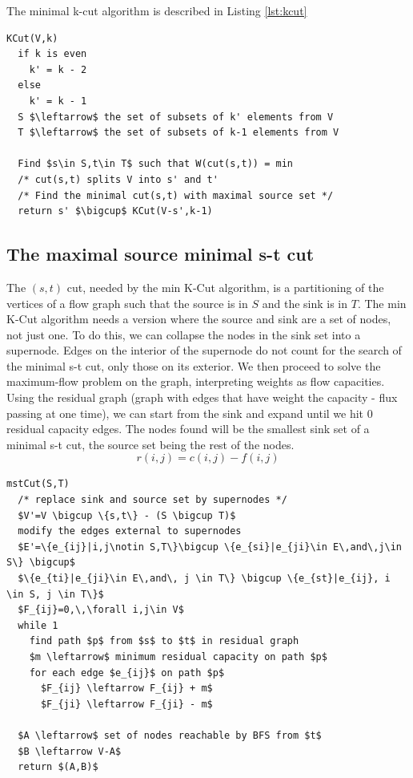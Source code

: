 The minimal k-cut algorithm is described in Listing \ref{lst:kcut}
\lstset{numbers=left, mathescape=true, title='SingleCNPT Algorithm', nolol=false,caption=Min K-cut algorithm,label=lst:kcut}
\begin{lstlisting}
KCut(V,k)
  if k is even
    k' = k - 2
  else
    k' = k - 1
  S $\leftarrow$ the set of subsets of k' elements from V
  T $\leftarrow$ the set of subsets of k-1 elements from V

  Find $s\in S,t\in T$ such that W(cut(s,t)) = min
  /* cut(s,t) splits V into s' and t'
  /* Find the minimal cut(s,t) with maximal source set */
  return s' $\bigcup$ KCut(V-s',k-1)
\end{lstlisting}

\subsection{The maximal source minimal s-t cut}

The $(s,t)$ cut, needed by the min K-Cut algorithm, is a partitioning of the vertices of a flow graph such that the source is in $S$ and the 
sink is in $T$. The min K-Cut algorithm needs a version where the source and sink are a set of nodes, not just one. To do this, we can collapse
the nodes in the sink set into a supernode. Edges on the interior of the supernode do not count for the search of the minimal s-t cut, only those
on its exterior. We then proceed to solve the maximum-flow problem on the graph, interpreting weights as flow capacities. Using the residual
graph (graph with edges that have weight the capacity - flux passing at one time), we can start from the sink and expand until we hit 0
residual capacity edges. The nodes found will be the smallest sink set of a minimal s-t cut, the source set being the rest of the nodes. 
\[ r(i,j) = c(i,j) - f(i,j) \]


\lstset{numbers=left, mathescape=true, nolol=false,caption=Maximal source minimal s-t cut,label=lst:stcut}
\begin{lstlisting}
mstCut(S,T)
  /* replace sink and source set by supernodes */
  $V'=V \bigcup \{s,t\} - (S \bigcup T)$
  modify the edges external to supernodes
  $E'=\{e_{ij}|i,j\notin S,T\}\bigcup \{e_{si}|e_{ji}\in E\,and\,j\in S\} \bigcup$
  $\{e_{ti}|e_{ji}\in E\,and\, j \in T\} \bigcup \{e_{st}|e_{ij}, i \in S, j \in T\}$
  $F_{ij}=0,\,\forall i,j\in V$
  while 1
    find path $p$ from $s$ to $t$ in residual graph
    $m \leftarrow$ minimum residual capacity on path $p$
    for each edge $e_{ij}$ on path $p$
      $F_{ij} \leftarrow F_{ij} + m$
      $F_{ji} \leftarrow F_{ji} - m$

  $A \leftarrow$ set of nodes reachable by BFS from $t$
  $B \leftarrow V-A$
  return $(A,B)$
\end{lstlisting}



